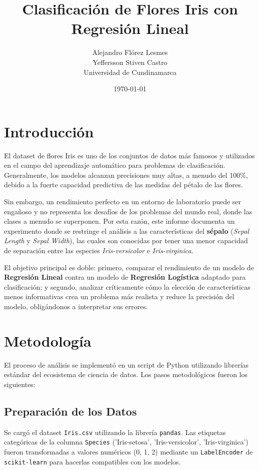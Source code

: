 \documentclass[12pt,a4paper]{article}
\title{Clasificación de Flores Iris con Regresión Lineal}
\author{Alejandro Flórez Lesmes \\ 
        Yeffersson Stiven Castro \\
        Universidad de Cundinamarca}
\date{\today}
\begin{document}
\maketitle

\section{Introducción}
El dataset de flores Iris es uno de los conjuntos de datos más famosos y utilizados en el campo del aprendizaje automático para problemas de clasificación. Generalmente, los modelos alcanzan precisiones muy altas, a menudo del 100\%, debido a la fuerte capacidad predictiva de las medidas del pétalo de las flores.

Sin embargo, un rendimiento perfecto en un entorno de laboratorio puede ser engañoso y no representa los desafíos de los problemas del mundo real, donde las clases a menudo se superponen. Por esta razón, este informe documenta un experimento donde se restringe el análisis a las características del \textbf{sépalo} (\textit{Sepal Length} y \textit{Sepal Width}), las cuales son conocidas por tener una menor capacidad de separación entre las especies \textit{Iris-versicolor} e \textit{Iris-virginica}.

El objetivo principal es doble: primero, comparar el rendimiento de un modelo de \textbf{Regresión Lineal} contra un modelo de \textbf{Regresión Logística} adaptado para clasificación; y segundo, analizar críticamente cómo la elección de características menos informativas crea un problema más realista y reduce la precisión del modelo, obligándonos a interpretar sus errores.

\section{Metodología}
El proceso de análisis se implementó en un script de Python utilizando librerías estándar del ecosistema de ciencia de datos. Los pasos metodológicos fueron los siguientes:

\subsection{Preparación de los Datos}
Se cargó el dataset \texttt{Iris.csv} utilizando la librería \texttt{pandas}. Las etiquetas categóricas de la columna \texttt{Species} ('Iris-setosa', 'Iris-versicolor', 'Iris-virginica') fueron transformadas a valores numéricos (0, 1, 2) mediante un \texttt{LabelEncoder} de \texttt{scikit-learn} para hacerlas compatibles con los modelos.
\end{document}
